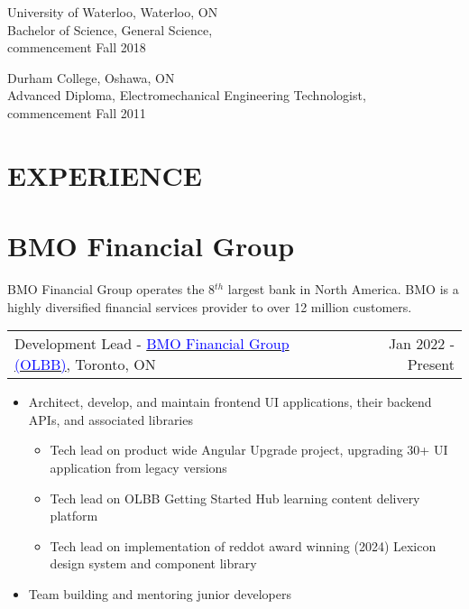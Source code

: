 \documentclass[margin]{res}
\begin{document}
\begin{resume}
	University of Waterloo, Waterloo, ON \\
	Bachelor of Science, General Science, \\
	commencement Fall 2018

	Durham College, Oshawa, ON \\
	Advanced Diploma, Electromechanical Engineering Technologist, \\
	commencement Fall 2011


	\section{\textcolor{NavyBlue}{EXPERIENCE}}

	\normalsize{\section{BMO Financial Group}}

	BMO Financial Group operates the 8\begin{math}^{th}\end{math} largest bank in North America. 
	BMO is a highly diversified financial services provider to over 12 million customers.

	\begin{tabular}{p{3in} r} %
		Development Lead - \href{https://bmo.com}{\textcolor{blue}{BMO Financial Group (OLBB)}}, Toronto, ON & Jan 2022 - Present
	\end{tabular}

	\begin{itemize} %
		\item Architect, develop, and maintain frontend UI applications, their backend APIs, and associated libraries
		\begin{itemize} 
			\item Tech lead on product wide Angular Upgrade project, upgrading 30+ UI application from legacy versions 
			\item Tech lead on OLBB Getting Started Hub learning content delivery platform
			\item Tech lead on implementation of reddot award winning (2024) Lexicon design system and component library
		 \end{itemize}
		\item Team building and mentoring junior developers
	\end{itemize}


\end{resume}
\end{document}
